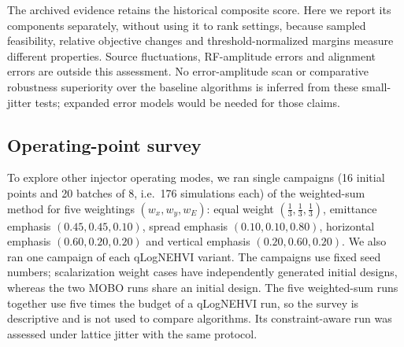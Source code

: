 \documentclass[aps,prab,reprint,superscriptaddress,amsmath,amssymb,floatfix]{revtex4-2}
\begin{document}
The archived evidence retains the historical composite score. Here we report its components
separately, without using it to rank settings, because sampled feasibility, relative objective
changes and threshold-normalized margins measure different properties. Source fluctuations,
RF-amplitude errors and alignment errors are outside this assessment. No error-amplitude scan or
comparative robustness superiority over the baseline algorithms is inferred from these
small-jitter tests; expanded error models would be needed for those claims.

\subsection{Operating-point survey}
\label{sec:survey}
To explore other injector operating modes, we ran single campaigns
(16 initial points and 20 batches of 8, i.e.\ 176 simulations each) of the weighted-sum
method for five weightings $(w_x, w_y, w_E)$: equal weight $(\frac13, \frac13, \frac13)$,
emittance emphasis $(0.45, 0.45, 0.10)$, spread emphasis $(0.10, 0.10, 0.80)$, horizontal
emphasis $(0.60, 0.20, 0.20)$ and vertical emphasis $(0.20, 0.60, 0.20)$. We also ran one campaign
of each qLogNEHVI variant. The campaigns use fixed seed numbers; scalarization weight cases have
independently
generated initial designs, whereas the two MOBO runs share an initial design.
The five weighted-sum runs together use five times the budget of a qLogNEHVI run, so the
survey is descriptive and is not used to compare algorithms. Its constraint-aware run was assessed
under lattice jitter
with the same protocol.
\end{document}
